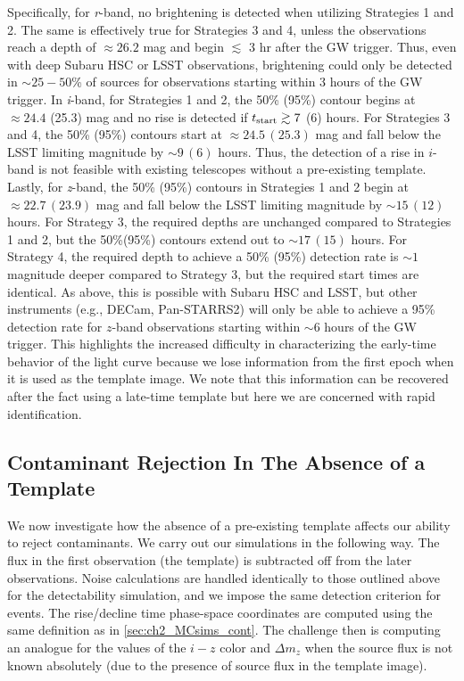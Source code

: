 Specifically, for {\em r}-band, no brightening is detected when utilizing Strategies 1 and 2. The same is effectively true for Strategies 3 and 4, unless the observations reach a depth of $\approx 26.2$ mag and begin $\lesssim$ 3 hr after the GW trigger. Thus, even with deep Subaru HSC or LSST observations, brightening could only be detected in $\sim25-50$\% of sources for observations starting within 3 hours of the GW trigger. In {\em i}-band, for Strategies 1 and 2, the 50\% (95\%) contour begins at $\approx 24.4$ (25.3) mag and no rise is detected if $t_{{\rm start}} \gtrsim 7$ (6) hours. For Strategies 3 and 4, the 50\% (95\%) contours start at $\approx 24.5\,(25.3)$ mag and fall below the LSST limiting magnitude by $\sim 9\,(6)$ hours. Thus, the detection of a rise in $i$-band is not feasible with existing telescopes without a pre-existing template. Lastly, for {\em z}-band, the 50\% (95\%) contours in Strategies 1 and 2 begin at $\approx 22.7\,(23.9)$ mag and fall below the LSST limiting magnitude by $\sim 15\,(12)$ hours. For Strategy 3, the required depths are unchanged compared to Strategies 1 and 2, but the 50\%(95\%) contours extend out to $\sim 17\,(15)$ hours. For Strategy 4, the required depth to achieve a 50\% (95\%) detection rate is $\sim 1$ magnitude deeper compared to Strategy 3, but the required start times are identical. As above, this is possible with Subaru HSC and LSST, but other instruments (e.g., DECam, Pan-STARRS2) will only be able to achieve a 95\% detection rate for $z$-band observations starting within $\sim6$ hours of the GW trigger. This highlights the increased difficulty in characterizing the early-time behavior of the light curve because we lose information from the first epoch when it is used as the template image. We note that this information can be recovered after the fact using a late-time template but here we are concerned with rapid identification.

\subsection{Contaminant Rejection In The Absence of a Template}
\label{sec:ch2_rejection}
We now investigate how the absence of a pre-existing template affects our ability to reject contaminants. We carry out our simulations in the following way. The flux in the first observation (the template) is subtracted off from the later observations. Noise calculations are handled identically to those outlined above for the detectability simulation, and we impose the same detection criterion for events. The rise/decline time phase-space coordinates are computed using the same definition as in \autoref{sec:ch2_MCsims_cont}. The challenge then is computing an analogue for the values of the $i-z$ color and $\Delta m_z$ when the source flux is not known absolutely (due to the presence of source flux in the template image).

